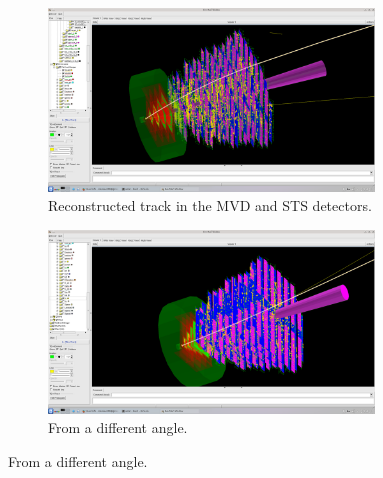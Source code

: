 \documentclass[a4paper,12pt]{article}
\begin{document}
\begin{figure}[H]
	\centering
	\begin{subfigure}{0.49\textwidth}
		\centering
		\includegraphics[width=0.95\textwidth]{reco2.png}
		\caption{ Reconstructed track in the MVD and STS detectors. }
	\end{subfigure}
	\begin{subfigure}{0.49\textwidth}
		\centering
		\includegraphics[width=0.95\textwidth]{reco1.png}
		\caption{ From a different angle. }
	\end{subfigure}
\end{figure}
\end{document}

